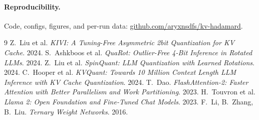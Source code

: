 \documentclass[11pt]{article}
\begin{document}
\paragraph{Reproducibility.} Code, configs, figures, and per-run data:
\href{https://github.com/aryxnsdfs/kv-hadamard}{github.com/aryxnsdfs/kv-hadamard}.

\begin{thebibliography}{9}
 Z.~Liu et al. \emph{KIVI: A Tuning-Free Asymmetric 2bit
Quantization for KV Cache}. 2024.
 S.~Ashkboos et al. \emph{QuaRot: Outlier-Free 4-Bit Inference
in Rotated LLMs}. 2024.
 Z.~Liu et al. \emph{SpinQuant: LLM Quantization with Learned
Rotations}. 2024.
 C.~Hooper et al. \emph{KVQuant: Towards 10 Million Context
Length LLM Inference with KV Cache Quantization}. 2024.
 T.~Dao. \emph{FlashAttention-2: Faster Attention with Better
Parallelism and Work Partitioning}. 2023.
 H.~Touvron et al. \emph{Llama 2: Open Foundation and
Fine-Tuned Chat Models}. 2023.
 F.~Li, B.~Zhang, B.~Liu. \emph{Ternary Weight Networks}. 2016.
\end{thebibliography}
\end{document}
